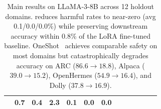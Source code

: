 \begin{table}[t]
{\begin{tabular}{@{}l ccc ccc ccc ccc@{}}
                       & \textbf{0.7}  & \textbf{0.4}  & \textbf{2.3}
                       & \textbf{0.1}  & \textbf{0.0}  & \textbf{0.0} \\
\bottomrule
\end{tabular}%
}
\caption{Main results on LLaMA-3-8B across 12 holdout domains. \method{} reduces harmful rates to near-zero (avg 0.1/0.0/0.0\%) while preserving downstream accuracy within 0.8\% of the LoRA fine-tuned baseline. OneShot~\citep{zhang2026safety} achieves comparable safety on most domains but catastrophically degrades accuracy on ARC ($86.6{\to}18.8$), Alpaca ($39.0{\to}15.2$), OpenHermes ($54.9{\to}16.4$), and Dolly ($37.8{\to}16.9$).}
\label{tab:main_results_llama3}
\end{table}
